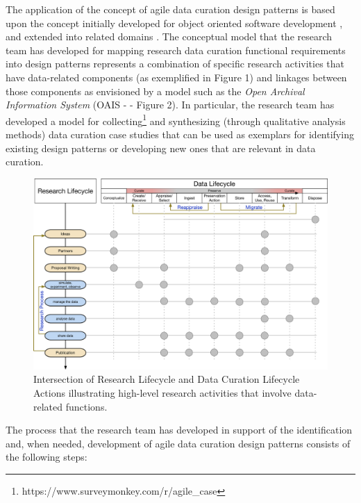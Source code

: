 \documentclass[paper]{ijdc-v9}
\begin{document}
The application of the concept of agile data curation design patterns is
based upon the concept initially developed for object oriented software
development \autocite{gamma_design_1995}, and extended into related
domains
\autocites[e.g.][]{daigneau_service_2011}{lasater_design_2010}{ackerman_patterns-based_2010}{schwinn_design_2005}{hohpe_enterprise_2003}.
The conceptual model that the research team has developed for mapping
research data curation functional requirements into design patterns
represents a combination of specific research activities that have
data-related components (as exemplified in Figure 1) and linkages
between those components as envisioned by a model such as the \emph{Open
Archival Information System} (OAIS -
\autocites{book_reference_2012}{_iso_2012}{oclc_open_2014} - Figure 2).
In particular, the research team has developed a model for
collecting\footnote{https://www.surveymonkey.com/r/agile\_case} and
synthesizing (through qualitative analysis methods) data curation case
studies that can be used as exemplars for identifying existing design
patterns or developing new ones that are relevant in data curation.

\begin{figure}[htbp]
\centering
\includegraphics{Research-DataLifecycleIntegration.png}
\caption{Intersection of Research Lifecycle \autocite{_how_2014} and
Data Curation Lifecycle Actions
\autocite{digital_curation_centre_dcc_dcc_nd} illustrating high-level
research activities that involve data-related functions.}
\end{figure}

The process that the research team has developed in support of the
identification and, when needed, development of agile data curation
design patterns consists of the following steps:
\end{document}
